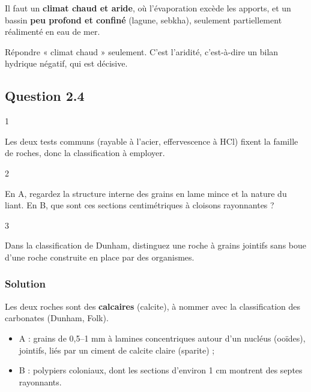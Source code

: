\documentclass[11pt,a4paper]{article}
\providecommand{\tightlist}{\setlength{\itemsep}{0pt}\setlength{\parskip}{0pt}}
\begin{document}
Il faut un \textbf{climat chaud et aride}, où l'évaporation excède les apports, et un bassin \textbf{peu profond et confiné} (lagune, sebkha), seulement partiellement réalimenté en eau de mer.

\begin{piege}

Répondre « climat chaud » seulement. C'est l'aridité, c'est-à-dire un bilan hydrique négatif, qui est décisive.

\end{piege}

\hypertarget{question-2.4}{%
\subsection{Question 2.4}\label{question-2.4}}

\begin{indication}{1}

Les deux tests communs (rayable à l'acier, effervescence à HCl) fixent la famille de roches, donc la classification à employer.

\end{indication}

\begin{indication}{2}

En A, regardez la structure interne des grains en lame mince et la nature du liant. En B, que sont ces sections centimétriques à cloisons rayonnantes ?

\end{indication}

\begin{indication}{3}

Dans la classification de Dunham, distinguez une roche à grains jointifs sans boue d'une roche construite en place par des organismes.

\end{indication}

\hypertarget{solution-14}{%
\subsubsection{Solution}\label{solution-14}}

Les deux roches sont des \textbf{calcaires} (calcite), à nommer avec la classification des carbonates (Dunham, Folk).

\begin{itemize}
\tightlist
\item
  A : grains de 0,5--1 mm à lamines concentriques autour d'un nucléus (ooïdes), jointifs, liés par un ciment de calcite claire (sparite) ;
\item
  B : polypiers coloniaux, dont les sections d'environ 1 cm montrent des septes rayonnants.
\end{itemize}
\end{document}
